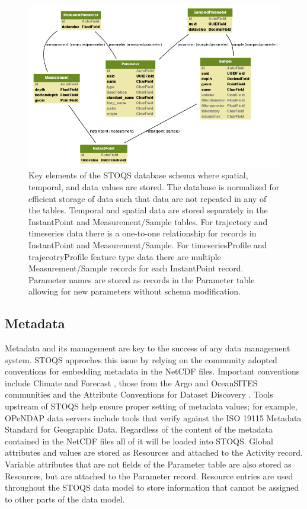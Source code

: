 \documentclass[conference]{IEEEtran}
\begin{document}
\begin{figure}[htbp]
\centering
\includegraphics[scale=0.5]{stoqs_simple_model.png}
\caption{Key elements of the STOQS database schema where spatial, temporal, and data values are stored. The database is normalized for efficient storage of data such that data are not repeated in any of the tables. Temporal and spatial data are stored separately in the InstantPoint and Measurement/Sample tables. For trajectory and timeseries data there is a one-to-one relationship for records in InstantPoint and Measurement/Sample. For timeseriesProfile and trajecotryProfile feature type data there are multiple Measurement/Sample records for each InstantPoint record. Parameter names are stored as records in the Parameter table allowing for new parameters without schema modification.}
\label{fig:stoqs_simple_model}
\end{figure}

\subsection{Metadata}

Metadata and its management are key to the success of any data management system. STOQS approches this issue by relying on the community adopted conventions for embedding metadata in the NetCDF files. Important conventions include Climate and Forecast \cite{CF}, those from the Argo and OceanSITES communities \cite{Pouliquen2006} and the Attribute Conventions for Dataset Discovery \cite{ACDD}. Tools upstream of STOQS help ensure proper setting of metadata values; for example, OPeNDAP data servers include tools that verify against the ISO 19115 Metadata Standard for Geographic Data. Regardless of the content of the metadata contained in the NetCDF files all of it will be loaded into STOQS. Global attributes and values are stored as Resources and attached to the Activity record. Variable attributes that are not fields of the Parameter table are also stored as Resources, but are attached to the Parameter record. Resource entries are used throughout the STOQS data model to store information that cannot be assigned to other parts of the data model.
\end{document}
